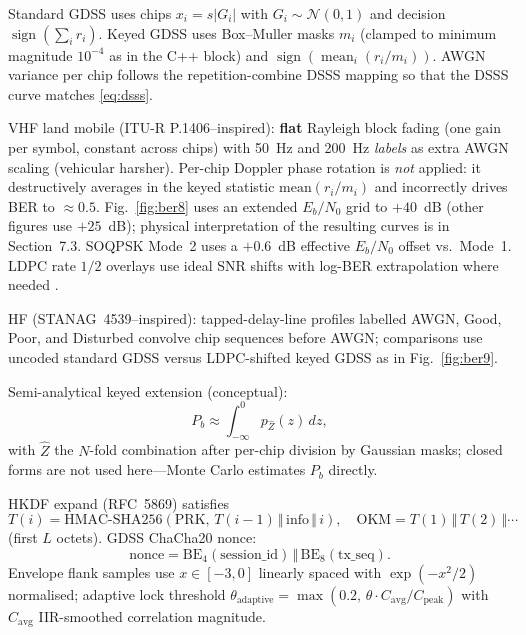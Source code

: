 \documentclass[10pt,a4paper,twocolumn]{article}
\begin{document}
Standard GDSS uses chips $x_i=s|G_i|$ with $G_i\sim\mathcal{N}(0,1)$ and decision $\operatorname{sign}(\sum_i r_i)$. Keyed GDSS uses Box--Muller masks $m_i$ (clamped to minimum magnitude $10^{-4}$ as in the C++ block) and $\operatorname{sign}(\operatorname{mean}_i(r_i/m_i))$. AWGN variance per chip follows the repetition-combine DSSS mapping so that the DSSS curve matches \eqref{eq:dsss}.

VHF land mobile (ITU-R P.1406--inspired): \textbf{flat} Rayleigh block fading (one gain per symbol, constant across chips) with 50~Hz and 200~Hz \emph{labels} as extra AWGN scaling (vehicular harsher). Per-chip Doppler phase rotation is \emph{not} applied: it destructively averages in the keyed statistic $\mathrm{mean}(r_i/m_i)$ and incorrectly drives BER to $\approx0.5$. Fig.~\ref{fig:ber8} uses an extended $E_b/N_0$ grid to $+40$~dB (other figures use $+25$~dB); physical interpretation of the resulting curves is in Section~7.3. SOQPSK Mode~2 uses a $+0.6$~dB effective $E_b/N_0$ offset vs.\ Mode~1. LDPC rate $1/2$ overlays use ideal SNR shifts with log-BER extrapolation where needed \cite{shakeel2023,repo_qrl,chung2001}.

HF (STANAG~4539--inspired): tapped-delay-line profiles labelled AWGN, Good, Poor, and Disturbed convolve chip sequences before AWGN; comparisons use uncoded standard GDSS versus LDPC-shifted keyed GDSS as in Fig.~\ref{fig:ber9}.

Semi-analytical keyed extension (conceptual):
\begin{equation}
P_b \approx \int_{-\infty}^{0} p_{\hat{Z}}(z)\,dz,
\end{equation}
with $\hat{Z}$ the $N$-fold combination after per-chip division by Gaussian masks; closed forms are not used here---Monte Carlo estimates $P_b$ directly.

HKDF expand (RFC~5869) satisfies
\begin{equation}
T(i)=\mathrm{HMAC\text{-}SHA256}(\mathrm{PRK},\,T(i{-}1)\,\Vert\,\mathrm{info}\,\Vert\,i),\quad \mathrm{OKM}=T(1)\,\Vert\,T(2)\,\Vert\cdots
\end{equation}
(first $L$ octets). GDSS ChaCha20 nonce:
\begin{equation}
\mathrm{nonce}=\mathrm{BE}_{4}(\mathrm{session\_id})\,\Vert\,\mathrm{BE}_{8}(\mathrm{tx\_seq}).
\end{equation}
Envelope flank samples use $x\in[-3,0]$ linearly spaced with $\exp(-x^2/2)$ normalised; adaptive lock threshold $\theta_{\mathrm{adaptive}}=\max(0.2,\,\theta\cdot C_{\mathrm{avg}}/C_{\mathrm{peak}})$ with $C_{\mathrm{avg}}$ IIR-smoothed correlation magnitude.
\end{document}
